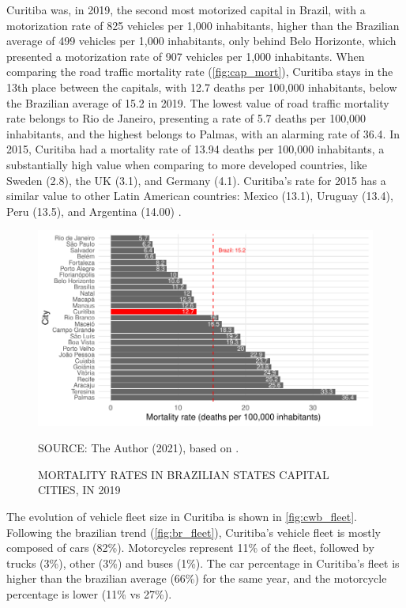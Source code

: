 Curitiba was, in 2019, the second most motorized capital in Brazil, with a motorization rate of 825 vehicles per 1,000 inhabitants, higher than the Brazilian average of 499 vehicles per 1,000 inhabitants, only behind Belo Horizonte, which presented a motorization rate of 907 vehicles per 1,000 inhabitants. When comparing the road traffic mortality rate (\autoref{fig:cap_mort}), Curitiba stays in the 13th place between the capitals, with 12.7 deaths per 100,000 inhabitants, below the Brazilian average of 15.2 in 2019. The lowest value of road traffic mortality rate belongs to Rio de Janeiro, presenting a rate of 5.7 deaths per 100,000 inhabitants, and the highest belongs to Palmas, with an alarming rate of 36.4. In 2015, Curitiba had a mortality rate of 13.94 deaths per 100,000 inhabitants, a substantially high value when comparing to more developed countries, like Sweden (2.8), the UK (3.1), and Germany (4.1). Curitiba's rate for 2015 has a similar value to other Latin American countries: Mexico (13.1), Uruguay (13.4), Peru (13.5), and Argentina (14.00) \cite{WHO2018}. 

\begin{figure}[!htbp]
    \centering\footnotesize
    \captionsetup{font=footnotesize}
    \caption{MORTALITY RATES IN BRAZILIAN STATES CAPITAL CITIES, IN 2019}
    \includegraphics{fig/cap_mort.pdf}
    \label{fig:cap_mort}
    \par SOURCE: The Author (2021), based on \textcite{MinistryofHealth2020,MinistryofHealth2021}.
\end{figure}  

The evolution of vehicle fleet size in Curitiba is shown in \autoref{fig:cwb_fleet}. Following the brazilian trend (\autoref{fig:br_fleet}), Curitiba's vehicle fleet is mostly composed of cars (82\%). Motorcycles represent 11\% of the fleet, followed by trucks (3\%), other (3\%) and buses (1\%). The car percentage in Curitiba's fleet is higher than the brazilian average (66\%) for the same year, and the motorcycle percentage is lower (11\% vs 27\%).

